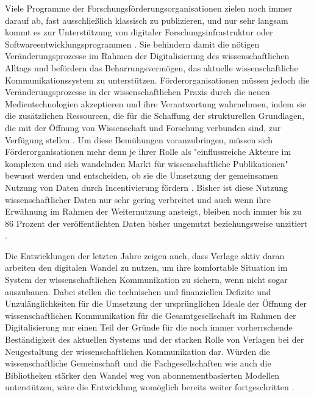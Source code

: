 Viele Programme der Forschungsförderungsorganisationen zielen noch immer darauf ab, fast ausschließlich klassisch zu publizieren, und nur sehr langsam kommt es zur Unterstützung von digitaler Forschungsinfrastruktur oder Softwareentwicklungsprogrammen \cite{Hey_2015}. Sie behindern damit die nötigen Veränderungsprozesse im Rahmen der Digitalisierung des wissenschaftlichen Alltags und befördern das Beharrungsvermögen, das aktuelle wissenschaftliche Kommunikationssystem zu unterstützen. Förderorganisationen müssen jedoch die Veränderungsprozesse in der wissenschaftlichen Praxis durch die neuen Medientechnologien akzeptieren und ihre Verantwortung wahrnehmen, indem sie die zusätzlichen Ressourcen, die für die Schaffung der strukturellen Grundlagen, die mit der Öffnung von Wissenschaft und Forschung verbunden sind, zur Verfügung stellen \cite{Mennes_2013} \cite{Patlak_2010}. Um diese Bemühungen voranzubringen, müssen sich Förderorganisationen mehr denn je ihrer Rolle als "einflussreiche Akteure im komplexen und sich wandelnden Markt für wissenschaftliche Publikationen" \cite[:287]{Wein_2010} bewusst werden und entscheiden, ob sie die Umsetzung der gemeinsamen Nutzung von Daten durch Incentivierung fördern \cite{Mennes_2013}. Bisher ist diese Nutzung wissenschaftlicher Daten nur sehr gering verbreitet und auch wenn ihre Erwähnung im Rahmen der Weiternutzung ansteigt, bleiben noch immer bis zu 86 Prozent der veröffentlichten Daten bisher ungenutzt beziehungsweise unzitiert \cite{Peters_2015}.

Die Entwicklungen der letzten Jahre zeigen auch, dass Verlage aktiv daran arbeiten den digitalen Wandel zu nutzen, um ihre komfortable Situation im System der wissenschaftlichen Kommunikation zu sichern, wenn nicht sogar auszubauen. Dabei stellen die technischen und finanziellen Defizite und Unzulänglichkeiten für die Umsetzung der ursprünglichen Ideale der Öffnung der wissenschaftlichen Kommunikation für die Gesamtgesellschaft im Rahmen der Digitalisierung nur einen Teil der Gründe für die noch immer vorherrschende Beständigkeit des aktuellen Systems und der starken Rolle von Verlagen bei der Neugestaltung der wissenschaftlichen Kommunikation dar. Würden die wissenschaftliche Gemeinschaft und die Fachgesellschaften wie auch die Bibliotheken stärker den Wandel weg von abonnementbasierten Modellen unterstützen, wäre die Entwicklung womöglich bereits weiter fortgeschritten \cite{Nosek_2012}.

